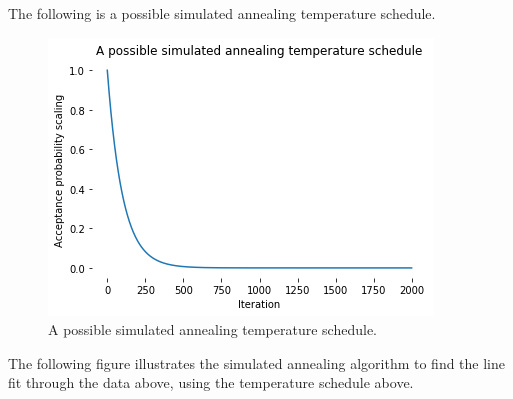 \documentclass[a4paper, openany]{memoir}
\begin{document}
The following is a possible simulated annealing temperature schedule.
\begin{figure}[H]
    \centering
    \includegraphics[scale=0.7]{src/4.18 a possible simulated annealing temperature schedule.png}
    \caption{A possible simulated annealing temperature schedule.}
\end{figure}
\noindent The following figure illustrates the simulated annealing algorithm to find the line fit through the data above, using the temperature schedule above.
\end{document}
